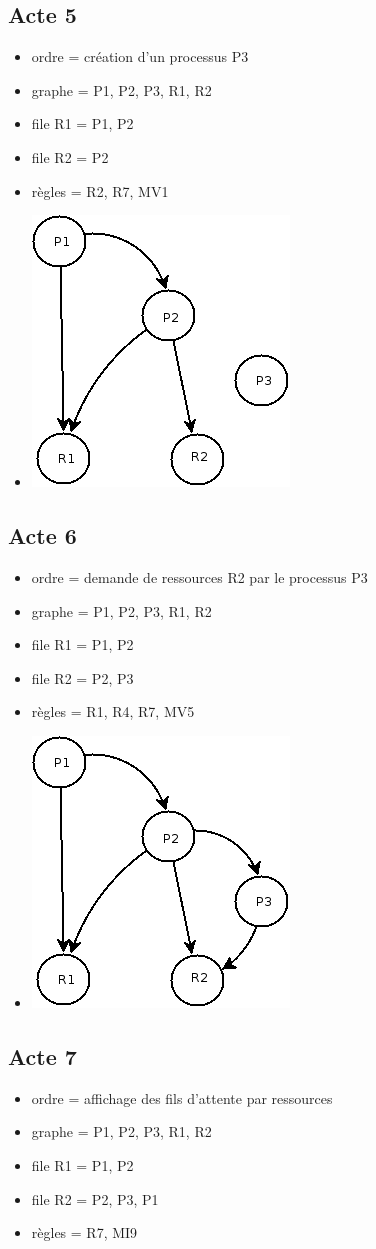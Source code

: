 \documentclass{article}
\newcommand{\bitem}{\item[\textbullet]}
\begin{document}
\subsection{Acte 5}
\begin{itemize}
  \bitem ordre = création d'un processus P3
  \bitem graphe = P1, P2, P3, R1, R2
  \bitem file R1 = P1, P2
  \bitem file R2 = P2
  \bitem règles = R2, R7, MV1
  \bitem \includegraphics[scale=0.5]{images/acte5}
\end{itemize}
\subsection{Acte 6}
\begin{itemize}
  \bitem ordre = demande de ressources R2 par le processus P3
  \bitem graphe = P1, P2, P3, R1, R2
  \bitem file R1 = P1, P2
  \bitem file R2 = P2, P3
  \bitem règles = R1, R4, R7, MV5
  \bitem \includegraphics[scale=0.5]{images/acte6}
\end{itemize}
\subsection{Acte 7}
\begin{itemize}
  \bitem ordre = affichage des fils d'attente par ressources
  \bitem graphe = P1, P2, P3, R1, R2
  \bitem file R1 = P1, P2
  \bitem file R2 = P2, P3, P1
  \bitem règles = R7, MI9
\end{itemize}
\end{document}
